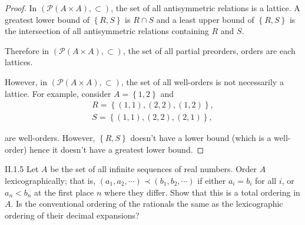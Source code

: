 \begin{proof}
	In \( (\mathscr{P}(A\times A), \subset) \), the set of all antisymmetric relations is a lattice. A greatest lower bound of \( \left\{ R, S \right\} \) is \( R \cap S \) and a least upper bound of \( \left\{ R, S \right\} \) is the intersection of all antisymmetric relations containing \( R \) and \( S \).

	Therefore in \( (\mathscr{P}(A\times A), \subset) \), the set of all partial preorders, orders are each lattices.

	However, in \( (\mathscr{P}(A\times A), \subset) \), the set of all well-orders is not necessarily a lattice. For example, consider \( A = \left\{ 1, 2 \right\} \) and
	\[
		\begin{split}
			R = \left\{ (1, 1), (2, 2), (1, 2) \right\}, \\
			S = \left\{ (1, 1), (2, 2), (2, 1) \right\},
		\end{split}
	\]

	are well-orders. However, \( \left\{ R, S \right\} \) doesn't have a lower bound (which is a well-order) hence it doesn't have a greatest lower bound.
\end{proof}

\begin{problem}{II.1.5}\label{problem:II.1.5}
Let \(A\) be the set of all infinite sequences of real numbers. Order \(A\) lexicographically; that is, \((a_{1}, a_{2}, \cdots) \prec (b_{1}, b_{2}, \cdots)\) if either \(a_{i} = b_{i}\) for all \(i\), or \(a_{n} < b_{n}\) at the first place \(n\) where they differ. Show that this is a total ordering in \(A\). Is the conventional ordering of the rationals the same as the lexicographic ordering of their decimal expansions?
\end{problem}

